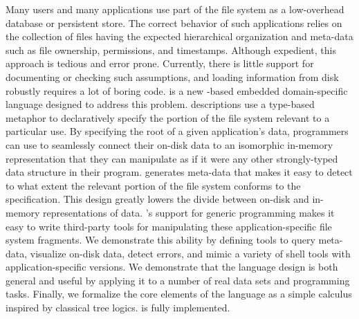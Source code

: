 Many users and many applications use part of the file system as a
low-overhead database or persistent store.  The correct behavior of
such applications relies on the collection of files having the
expected hierarchical organization and meta-data such as file
ownership, permissions, and timestamps.  Although expedient, this
approach is tedious and error prone.  Currently, there is little
support for documenting or checking such assumptions, and loading
information from disk robustly requires a lot of boring code.
\forest{} is a new \haskell{}-based embedded domain-specific language
designed to address this problem.  \forest{} descriptions use a
type-based metaphor to declaratively specify the portion of the file
system relevant to a particular use.  By specifying the root of a
given application's data, programmers can use \forest{} to seamlessly
connect their on-disk data to an isomorphic in-memory representation
that they can manipulate as if it were any other strongly-typed data
structure in their program.  \forest{} generates meta-data that
makes it easy to detect to what extent the relevant portion of the
file system conforms to the specification.  This design greatly lowers
the divide between on-disk and in-memory representations of data.
\haskell{}'s support for generic programming makes it easy to write
third-party tools for manipulating these application-specific file
system fragments.  We demonstrate this ability by defining tools to
query meta-data, visualize on-disk data, detect errors, and mimic a
variety of shell tools with application-specific versions.  We
demonstrate that the language design is both general and useful by
applying it to a number of real data sets and programming tasks.
Finally, we formalize the core elements of the language as a simple
calculus inspired by classical tree logics. \forest{} is fully
implemented.
